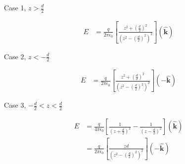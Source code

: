 \documentclass{article}
\begin{document}
Case 1, $z > \frac{d}{2}$

\begin{align*}
E &= \frac{q}{2 \pi \epsilon_0} 
\left[ 
\frac{z^2 + (\frac{d}{2})^2}{(z^2 - (\frac{d}{2})^2)^2}
\right] \mathbf{(\hat{k})}
\end{align*}

Case 2, $z < -\frac{d}{2}$

\begin{align*}
E &= \frac{q}{2 \pi \epsilon_0} 
\left[ 
\frac{z^2 + (\frac{d}{2})^2}{(z^2 - (\frac{d}{2})^2)^2}
\right] (-\mathbf{\hat{k}})
\end{align*}

Case 3, $-\frac{d}{2} < z < \frac{d}{2}$

\begin{align*}
E &= \frac{q}{4 \pi \epsilon_0} 
\left[ 
\frac{1}{(z + \frac{d}{2})^2} - \frac{1}{(z - \frac{d}{2})^2}
\right] (\mathbf{\hat{k}})\\
&= \frac{q}{2 \pi \epsilon_0} 
\left[ 
\frac{zd}{(z^2 - (\frac{d}{2})^2)^2}
\right] (-\mathbf{\hat{k}})
\end{align*}
\end{document}
